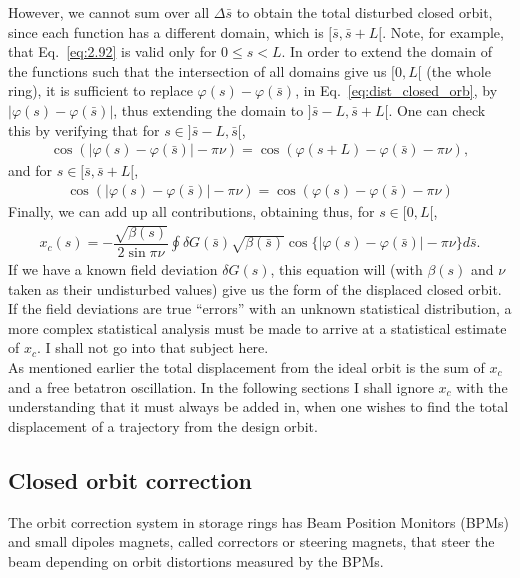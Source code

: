 However, we cannot sum over all $\Delta \bar{s}$ to obtain the total disturbed closed orbit, since each function has a different domain, which is $[\bar{s},\bar{s}+L[$. Note, for example, that Eq.~\eqref{eq:2.92} is valid only for $0 \leq s < L$. In order to extend the domain of the functions such that the intersection of all domains give us $[0,L[$ (the whole ring), it is sufficient to replace $\varphi(s) - \varphi(\bar{s})$, in Eq.~\eqref{eq:dist_closed_orb}, by $|\varphi(s) - \varphi(\bar{s})|$, thus extending the domain to $]\bar{s}-L,\bar{s}+L[$. One can check this by verifying that for $s \in ]\bar{s}-L,\bar{s}[$,
\begin{align*}
	\cos(|\varphi(s) - \varphi(\bar{s})| - \pi\nu) = \cos(\varphi(s+L) - \varphi(\bar{s})-\pi\nu),
\end{align*}
and for $s \in [\bar{s},\bar{s}+L[$,
\begin{align*}
\cos(|\varphi(s) - \varphi(\bar{s})| - \pi\nu) = \cos(\varphi(s) - \varphi(\bar{s}) - \pi\nu)
\end{align*}
Finally, we can add up all contributions, obtaining thus, for $s \in [0,L[$,
\begin{align}\label{eq:2.94}
	\boxed{ x_c(s) = -\dfrac{\sqrt{\beta(s)}}{2\sin\pi\nu} \oint \delta G(\bar{s}) \sqrt{\beta(\bar{s})}\cos\{ |\varphi(s) - \varphi(\bar{s})| - \pi\nu \} d\bar{s} }.
\end{align}
If we have a known field deviation $\delta G(s)$, this equation will (with $\beta(s)$ and $\nu$ taken as their undisturbed values) give us the form of the displaced closed orbit.\\
If the field deviations are true ``errors'' with an unknown statistical distribution, a more complex statistical analysis must be made to arrive at a statistical estimate of $x_c$. I shall not go into that subject here.\\
As mentioned earlier the total displacement from the ideal orbit is the sum of $x_c$ and a free betatron oscillation. In the following sections I shall ignore $x_c$ with the understanding
 that it must always be added in, when one wishes to find the total displacement of a trajectory
 from the design orbit.

 \subsection{Closed orbit correction}

 The orbit correction system in storage rings has Beam Position Monitors (BPMs) and small dipoles magnets, called correctors or steering magnets, that steer the beam depending on orbit distortions measured by the BPMs.

